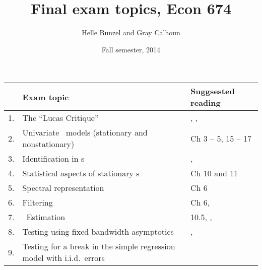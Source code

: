\documentclass[nofonts,nols]{tufte-handout}
\title{Final exam topics, Econ 674}
\author{Helle Bunzel and Gray Calhoun}
\date{Fall semester, 2014}
\renewcommand{\allcaps}[1]{\textls{\MakeUppercase{#1}}}
\newcommand{\ARMA}{\allcaps{ARMA}}
\newcommand{\HAC}{\allcaps{HAC}}
\newcommand{\SVAR}{\allcaps{SVAR}}
\newcommand{\VAR}{\allcaps{VAR}}
\begin{document}
\maketitle

\begin{table*}[h]
  \begin{tabularx}{\textwidth}{rXX}
    \toprule
        & Exam topic                                                             & Suggsested reading                                                                                      \\
    \midrule
    1.  & The ``Lucas Critique''                                                 & \citep{Lu76}, \citep{No11}, \citep{Si12}                                                                \\
    2.  & Univariate \ARMA\ models (stationary and nonstationary)                & \citep{Ha94} Ch 3 -- 5, 15 -- 17                                                                        \\
    3.  & Identification in \SVAR s                                              & \citep{Si80}, \citep{Ki13}                                                                              \\
    4.  & Statistical aspects of stationary \VAR s                               & \citep{Ha94} Ch 10 and 11                                                                               \\
    5.  & Spectral representation                                                & \citep{Ha94} Ch 6                                                                                       \\
    6.  & Filtering                                                              & \citep{Ha94} Ch 6, \citep{BK99}                                                                         \\
    7.  & \HAC\ Estimation                                                       & \citep{Ha94} 10.5, \citep{NW87}, \citep{An91}                                                           \\
    8.  & Testing using fixed bandwidth asymptotics                              & \citep{KV05}, \citep{Su14}                                                                              \\
    9.  & Testing for a break in the simple regression model with i.i.d.\ errors & \citep[Sec 5]{St94}                                                                                     \\

\end{tabularx}
\end{table*}
\end{document}
